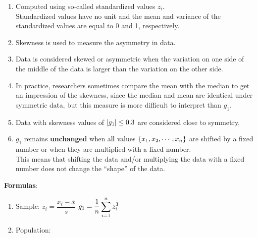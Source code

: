 \begin{enumerate}
    \item Computed using so-called standardized values $z_i$. \hfill \cite{statistics/book/Statistics-for-Data-Scientists/Maurits-Kaptein} \\
    Standardized values have no unit and the mean and variance of the standardized values are equal to 0 and 1, respectively. \hfill \cite{statistics/book/Statistics-for-Data-Scientists/Maurits-Kaptein}

    \item Skewness is used to measure the asymmetry in data. \hfill \cite{statistics/book/Statistics-for-Data-Scientists/Maurits-Kaptein}

    \item Data is considered skewed or asymmetric when the variation on one side of the middle of the data is larger than the variation on the other side. \hfill \cite{statistics/book/Statistics-for-Data-Scientists/Maurits-Kaptein}

    \item In practice, researchers sometimes compare the mean with the median to get an impression of the skewness, since the median and mean are identical under symmetric data, but this measure is more difficult to interpret than $g_1$. \hfill \cite{statistics/book/Statistics-for-Data-Scientists/Maurits-Kaptein}
    
    \item Data with skewness values of $\left| g_1 \right| \leq 0.3$ are considered close to symmetry, \hfill \cite{statistics/book/Statistics-for-Data-Scientists/Maurits-Kaptein}

    \item $g_1$ remains \textbf{unchanged} when all values $\left\{x_1, x_2, \cdots, x_n\right\}$ are shifted by a fixed number or when they are multiplied with a fixed number. \hfill \cite{statistics/book/Statistics-for-Data-Scientists/Maurits-Kaptein} \\
    This means that shifting the data and/or multiplying the data with a fixed number does not change the “shape” of the data. \hfill \cite{statistics/book/Statistics-for-Data-Scientists/Maurits-Kaptein}
\end{enumerate}


\vspace{0.3cm}
\textbf{Formulas}:
\begin{enumerate}
    \item Sample:
    \label{Data/Describing Data/Central Tendency/Skewness/Sample}
    \label{Data/Describing Data/Central Tendency/Skewness/z-value}
    \hspace{1cm}  
    $z_i = \dfrac{x_i - \bar{x}}{s}$ 
    \hspace{1cm}  
    $g_1 = \dfrac{1}{n} \displaystyle\sum_{i=1}^{n} z_i^3$

    \item Population:
\end{enumerate}


